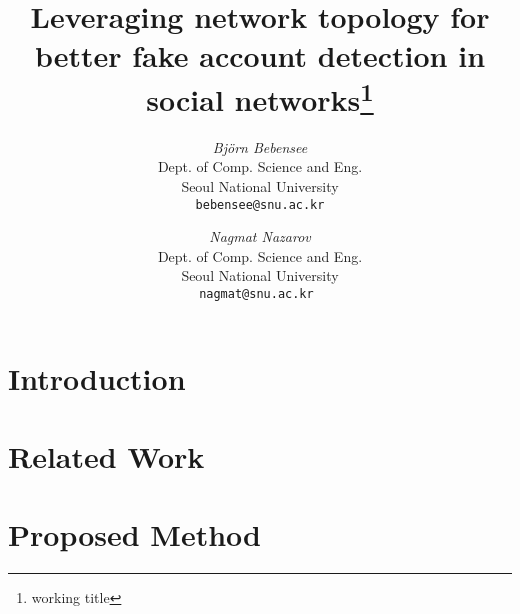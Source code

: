 \documentclass[12pt]{article}
\makeatletter
\let\oldabstract\abstract
\let\oldendabstract\endabstract
\renewenvironment{abstract}
{\renewenvironment{quotation}%
               {\list{}{\addtolength{\leftmargin}{3em} %
                        \listparindent 1.5em%
                        \itemindent    \listparindent%
                        \rightmargin   \leftmargin%
                        \parsep        \z@ \@plus\p@}%
                \item\relax}%
               {\endlist}%
\oldabstract}
{\oldendabstract}
\makeatother
\begin{document}
\newcommand{\beq}{\begin{equation}}
\newcommand{\eeq}{\end{equation}}
\newcommand{\bit}{\begin{itemize*}}
\newcommand{\eit}{\end{itemize*}}
\newcommand{\goal}[1]{ {\noindent {$\Rightarrow$} \em {#1} } }
\newcommand{\hide}[1]{}
\newcommand{\comment}[1]{ {\footnotesize {#1} } }
\newtheorem{lemma}{Lemma}
\newtheorem{theorem}{Theorem}
\newtheorem{proof}{Proof}
\newtheorem{defn}{Definition}
\newtheorem{algo}{Algorithm}
\newtheorem{observation}{Observation}

\title{Leveraging network topology for better fake account detection in social networks\footnote{working title}}


\author{ {\em Björn Bebensee} \\
	    Dept. of Comp. Science and Eng.\\
	    Seoul National University\\
	    {\tt bebensee@snu.ac.kr}
	 \and
	 {\em Nagmat Nazarov} \\
	     Dept. of Comp. Science and Eng.\\
	     Seoul National University \\
	     {\tt nagmat@snu.ac.kr }
        }
\date{}

\maketitle
\begin{abstract}
    
\end{abstract}

\section{Introduction}
    \label{sec:intro}
    

\section{Related Work}
    \label{sec:survey}
    


\section{Proposed Method}
    \label{sec:proposed}
    
\end{document}
